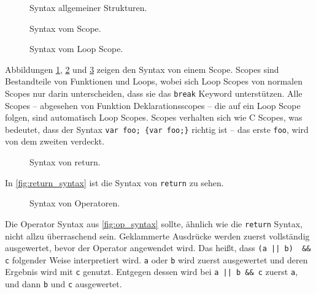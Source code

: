     \begin{figure}[H]
      \centering
      \caption{Syntax allgemeiner Strukturen.}
      \label{fig:common_syntax}
    \end{figure}

    \begin{figure}[H]
      \centering
      \caption{Syntax vom Scope.}
      \label{fig:scope_syntax}
    \end{figure}

    \begin{figure}[H]
      \centering
      \caption{Syntax vom Loop Scope.}
      \label{fig:loop_scope_syntax}
    \end{figure}
    Abbildungen \ref{fig:common_syntax}, \ref{fig:scope_syntax} und \ref{fig:loop_scope_syntax} zeigen den Syntax von einem Scope. Scopes sind Bestandteile von Funktionen und Loops, wobei sich Loop Scopes von normalen Scopes nur darin unterscheiden, dass sie das \lstinline[style=MyMacroStyle]$break$ Keyword unterstützen. Alle Scopes -- abgesehen von Funktion Deklarationsscopes -- die auf ein Loop Scope folgen, sind automatisch Loop Scopes. Scopes verhalten sich wie C Scopes, was bedeutet, dass der Syntax \lstinline[style=MyMacroStyle]$var foo; {var foo;}$ richtig ist -- das erste \lstinline[style=MyMacroStyle]$foo$, wird von dem zweiten verdeckt.

    \begin{figure}[H]
      \centering
      \caption{Syntax von return.}
      \label{fig:return_syntax}
    \end{figure}
    In \autoref{fig:return_syntax} ist die Syntax von \lstinline[style=MyMacroStyle]$return$ zu sehen.

    \begin{figure}[H]
      \centering
      \caption{Syntax von Operatoren.}
      \label{fig:op_syntax}
    \end{figure}
    Die Operator Syntax aus \autoref{fig:op_syntax} sollte, ähnlich wie die \lstinline[style=MyMacroStyle]$return$ Syntax, nicht allzu überraschend sein. Geklammerte Ausdrücke werden zuerst vollständig ausgewertet, bevor der Operator angewendet wird. Das heißt, dass \lstinline[style=MyMacroStyle]$(a || b)  && c$ folgender Weise interpretiert wird. \lstinline[style=MyMacroStyle]$a$ oder \lstinline[style=MyMacroStyle]$b$ wird zuerst ausgewertet und deren Ergebnis wird mit \lstinline[style=MyMacroStyle]$c$ genutzt. Entgegen dessen wird bei \lstinline[style=MyMacroStyle]$a || b && c$ zuerst \lstinline[style=MyMacroStyle]$a$, und dann \lstinline[style=MyMacroStyle]$b$ und \lstinline[style=MyMacroStyle]$c$ ausgewertet.

